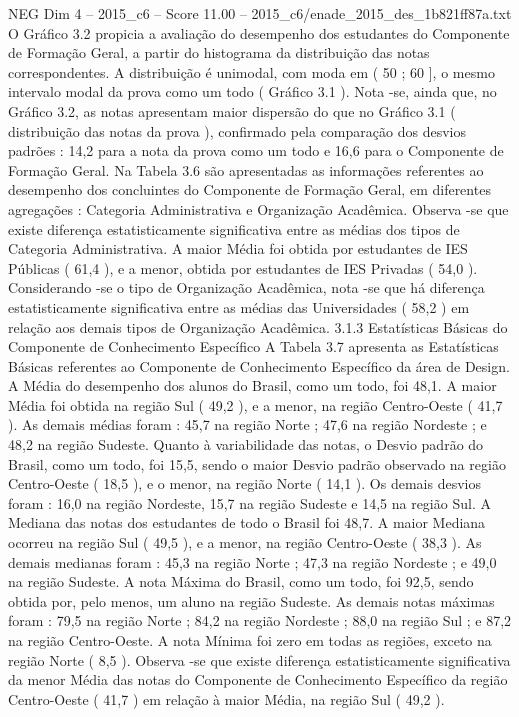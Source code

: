 \begin{textsample}{NEG Dim 4 – 2015\_c6 – Score 11.00 – 2015\_c6/enade\_2015\_des\_1b821ff87a.txt}
O Gráfico 3.2 propicia a avaliação do desempenho dos estudantes do Componente de Formação Geral, a partir do histograma da distribuição das notas correspondentes.
A distribuição é unimodal, com moda em ( 50 ; 60 ], o mesmo intervalo modal da prova como um todo ( Gráfico 3.1 ).
Nota -se, ainda que, no Gráfico 3.2, as notas apresentam maior dispersão do que no Gráfico 3.1 ( distribuição das notas da prova ), confirmado pela comparação dos desvios padrões : 14,2 para a nota da prova como um todo e 16,6 para o Componente de Formação Geral.
Na Tabela 3.6 são apresentadas as informações referentes ao desempenho dos concluintes do Componente de Formação Geral, em diferentes agregações : Categoria Administrativa e Organização Acadêmica.
Observa -se que existe diferença estatisticamente significativa entre as médias dos tipos de Categoria Administrativa.
A maior Média foi obtida por estudantes de IES Públicas ( 61,4 ), e a menor, obtida por estudantes de IES Privadas ( 54,0 ).
Considerando -se o tipo de Organização Acadêmica, nota -se que há diferença estatisticamente significativa entre as médias das Universidades ( 58,2 ) em relação aos demais tipos de Organização Acadêmica. 3.1.3 Estatísticas Básicas do Componente de Conhecimento Específico A Tabela 3.7 apresenta as Estatísticas Básicas referentes ao Componente de Conhecimento Específico da área de Design.
A Média do desempenho dos alunos do Brasil, como um todo, foi 48,1.
A maior Média foi obtida na região Sul ( 49,2 ), e a menor, na região Centro-Oeste ( 41,7 ).
As demais médias foram : 45,7 na região Norte ; 47,6 na região Nordeste ; e 48,2 na região Sudeste.
Quanto à variabilidade das notas, o Desvio padrão do Brasil, como um todo, foi 15,5, sendo o maior Desvio padrão observado na região Centro-Oeste ( 18,5 ), e o menor, na região Norte ( 14,1 ).
Os demais desvios foram : 16,0 na região Nordeste, 15,7 na região Sudeste e 14,5 na região Sul.
A Mediana das notas dos estudantes de todo o Brasil foi 48,7.
A maior Mediana ocorreu na região Sul ( 49,5 ), e a menor, na região Centro-Oeste ( 38,3 ).
As demais medianas foram : 45,3 na região Norte ; 47,3 na região Nordeste ; e 49,0 na região Sudeste.
A nota Máxima do Brasil, como um todo, foi 92,5, sendo obtida por, pelo menos, um aluno na região Sudeste.
As demais notas máximas foram : 79,5 na região Norte ; 84,2 na região Nordeste ; 88,0 na região Sul ; e 87,2 na região Centro-Oeste.
A nota Mínima foi zero em todas as regiões, exceto na região Norte ( 8,5 ).
Observa -se que existe diferença estatisticamente significativa da menor Média das notas do Componente de Conhecimento Específico da região Centro-Oeste ( 41,7 ) em relação à maior Média, na região Sul ( 49,2 ).

\end{textsample}
